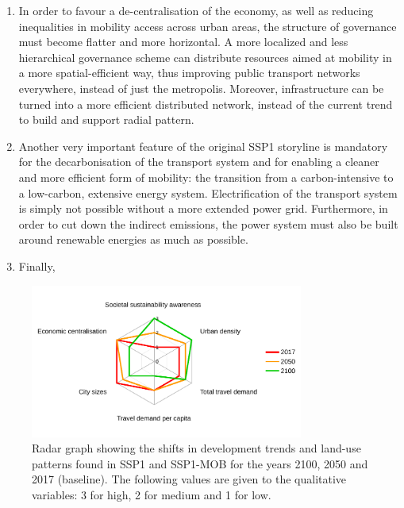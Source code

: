 \begin{enumerate}
\item In order to favour a de-centralisation of the economy, as well as reducing inequalities in mobility access across urban areas, the structure of governance must become flatter and more horizontal. A more localized and less hierarchical governance scheme can distribute resources aimed at mobility in a more spatial-efficient way, thus improving public transport networks everywhere, instead of just the metropolis. Moreover, infrastructure can be turned into a more efficient distributed network, instead of the current trend to build and support radial pattern.
\item Another very important feature of the original SSP1 storyline is mandatory for the decarbonisation of the transport system and for enabling a cleaner and more efficient form of mobility: the transition from a carbon-intensive to a low-carbon, extensive energy system. Electrification of the transport system is simply not possible without a more extended power grid. Furthermore, in order to cut down the indirect  emissions, the power system must also be built around renewable energies as much as possible.
\item Finally, 
\end{enumerate}

\begin{figure}
\centering
\includegraphics[width=0.8\textwidth]{figures/radar_development-scenario}
\caption[Shifts in development and land-use patterns in SSP1-MOB.]{Radar graph showing the shifts in development trends and land-use patterns found in SSP1 and SSP1-MOB for the years 2100, 2050 and 2017 (baseline). The following values are given to the qualitative variables: 3 for high, 2 for medium and 1 for low.}
\label{f:results:radar_development-scenario}
\end{figure}

